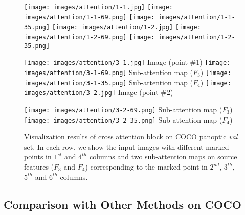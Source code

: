\documentclass[runningheads]{llncs}
\begin{document}
\begin{figure}[t]
\small
{}
  \texttt{[image: images/attention/1-1.jpg]}
\endminipage\hfill
{}
  \texttt{[image: images/attention/1-1-69.png]}
\endminipage\hfill
{}\texttt{[image: images/attention/1-1-35.png]}
\endminipage \hfill
{}
  \texttt{[image: images/attention/1-2.jpg]}
\endminipage\hfill
{}
  \texttt{[image: images/attention/1-2-69.png]}
\endminipage\hfill
{}\texttt{[image: images/attention/1-2-35.png]}
\endminipage 



\centering
  \texttt{[image: images/attention/3-1.jpg]}
 Image \:    (point \#1) 
\endminipage\hfill
{}
\centering
  \texttt{[image: images/attention/3-1-69.png]}
  Sub-attention map ($F_3$)
\endminipage\hfill
{}\centering
  \texttt{[image: images/attention/3-1-35.png]}
  Sub-attention map ($F_4$)
\endminipage \hfill
{}
\centering
  \texttt{[image: images/attention/3-2.jpg]}
 Image \:    (point \#2) 

\endminipage\hfill
{}
\centering
  \texttt{[image: images/attention/3-2-69.png]}
  Sub-attention map ($F_3$)
\endminipage\hfill
{}\centering
  \texttt{[image: images/attention/3-2-35.png]}
  \small{Sub-attention map ($F_4$)}
\endminipage 
\caption{Visualization results of cross attention block on COCO panoptic \emph{val} set. In each row, we show the input images with different marked points in $1^{st}$ and $4^{th}$ columns and two sub-attention maps on source features ($F_3$ and $F_4$) corresponding to the marked point in  $2^{nd}$,  $3^{th}$,  $5^{th}$ and  $6^{th}$ columns.  }
\label{fig:cla_fusion_attention}
\end{figure}

\subsection{Comparison with Other Methods on COCO}
 
\end{document}
